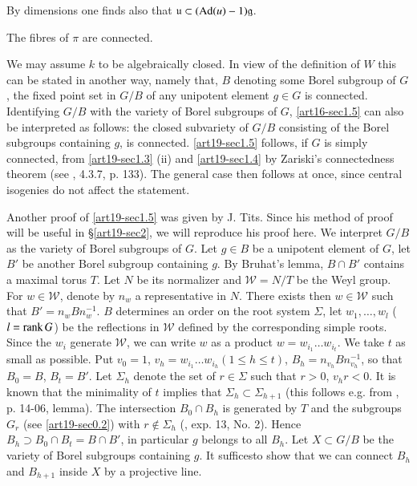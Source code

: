 \begin{remark*}
By dimensions one finds also that $\mathfrak{u}\subset (\operatorname{\mathrm{Ad}} (u)-1)\mathfrak{g}$.
\end{remark*}

\begin{proposition}\label{art19-prop1.5}
The fibres of $\pi$ are connected.
\end{proposition}

We may assume $k$ to be algebraically closed. In view of the definition of $W$ this can be stated in another way, namely that, $B$ denoting some Borel subgroup of $G$, the fixed point set in $G/B$ of any unipotent element $g\in G$ is connected. Identifying $G/B$ with the variety of Borel subgroups of $G$, \ref{art16-sec1.5} can also be interpreted as follows: the closed subvariety of $G/B$ consisting of the Borel subgroups containing $g$, is connected. \ref{art19-sec1.5} follows, if $G$ is simply connected, from \ref{art19-sec1.3} (ii) and \ref{art19-sec1.4} by Zariski's connectedness theorem (see \cite{art19-key7}, 4.3.7, p. 133). The general case then follows at once, since central isogenies do not affect the statement.

Another proof of \ref{art19-sec1.5} was given by J. Tits. Since his method of proof will be useful in \S\ref{art19-sec2}, we will reproduce his proof here. We interpret $G/B$ as the variety of Borel subgroups of $G$. Let $g\in B$ be a unipotent element of $G$, let $B'$ be another Borel subgroup containing $g$. By Bruhat's lemma, $B\cap B'$ contains a maximal torus $T$. Let $N$ be its normalizer and $\mathscr{W}=N/T$ be the Weyl group. For $w\in \mathscr{W}$, denote by $n_{w}$ a representative in $N$. There exists then $w\in \mathscr{W}$ such that $B'=n_{w}Bn^{-1}_{w}$. $B$ determines an order on the root system $\Sigma$, let $w_{1},\ldots,w_{l}$ ($l=\operatorname{\mathrm{rank}} G$) be the reflections in $\mathscr{W}$ defined by the corresponding simple roots. Since the $w_{i}$ generate $\mathscr{W}$, we can write $w$ as a product $w=w_{i_{1}}\ldots w_{i_{t}}$. We take $t$ as small as possible. Put $v_{0}=1$, $v_{h}=w_{i_{1}}\ldots w_{i_{h}}(1\leq h\leq t)$, $B_{h}=n_{v_{h}}Bn^{-1}_{v_{h}}$, so that $B_{0}=B$, $B_{t}=B'$. Let $\Sigma_{h}$ denote the set of $r\in \Sigma$ such that $r>0$, $v_{h}r<0$. It is known that the minimality of $t$ implies that $\Sigma_{h}\subset \Sigma_{h+1}$ (this follows e.g. from \cite{art19-key5}, p. 14-06, lemma). The intersection $B_{0}\cap B_{h}$ is generated by $T$ and the subgroups $G_{r}$ (see \ref{art19-sec0.2}) with $r\not\in \Sigma_{h}$ (\cite{art19-key5}, exp. 13, No. 2). Hence $B_{h}\supset B_{0}\cap B_{t}=B\cap B'$, in particular $g$ belongs to all $B_{h}$. Let $X\subset G/B$ be the variety of Borel subgroups containing $g$. It suffices\pageoriginale to show that we can connect $B_{h}$ and $B_{h+1}$ inside $X$ by a projective line.

